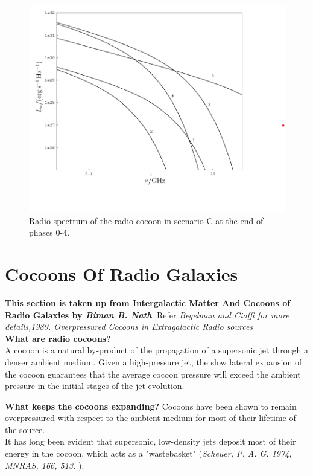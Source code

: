 \documentclass[11pt]{report}
\newcommand{\tbf}[1]{\textbf{#1}}
\newcommand{\tit}[1]{\textit{#1}}
\begin{document}
\begin{itemize}
\begin{figure}[h!]\label{figsceC}
\includegraphics[scale=1]{figsceC.png}
\caption{Radio spectrum of the radio cocoon in scenario C at the end of phases 0-4.  }
\end{figure}
\end{itemize}
\chapter{Cocoons Of Radio Galaxies}
\tbf{This section is taken up from Intergalactic Matter And Cocoons of Radio Galaxies by \tit{Biman B. Nath}}. Refer \tit{Begelman and Cioffi for more details,1989. Overpressured Cocoons in Extragalactic Radio sources}\\
\tbf{What are radio cocoons?}\\
A cocoon is a natural by-product of the propagation of a supersonic jet through a denser ambient medium. Given a high-pressure jet, the slow lateral expansion of the cocoon guarantees that the average cocoon pressure will exceed the ambient pressure in the initial stages of the jet evolution. 

\tbf{What keeps the cocoons expanding?}
Cocoons have been shown to remain overpressured with respect to the ambient medium for most of their lifetime of the source.\\


 It has long been evident that supersonic, low-density jets deposit most of their energy in the cocoon, which acts as a "wastebasket" (\tit{Scheuer, P. A. G. 1974, MNRAS, 166, 513.
}).\\
\end{document}
